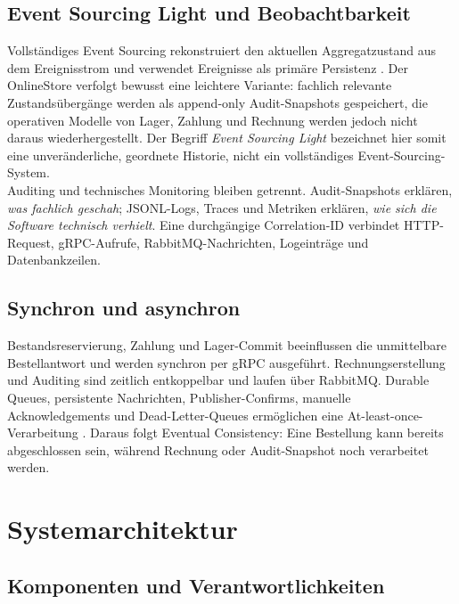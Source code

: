 \documentclass[10pt,a4paper]{article}
\newcommand{\littleGap}{\vspace{8mm}}
\newcommand{\midGap}{\vspace{12mm}}
\begin{document}
\midGap

\subsection{Event Sourcing Light und Beobachtbarkeit}

Vollständiges Event Sourcing rekonstruiert den aktuellen Aggregatzustand aus
dem Ereignisstrom und verwendet Ereignisse als primäre Persistenz
\cite{fowler}. Der OnlineStore verfolgt bewusst eine leichtere Variante:
fachlich relevante Zustandsübergänge werden als append-only Audit-Snapshots
gespeichert, die operativen Modelle von Lager, Zahlung und Rechnung werden
jedoch nicht daraus wiederhergestellt. Der Begriff \emph{Event Sourcing Light}
bezeichnet hier somit eine unveränderliche, geordnete Historie, nicht ein
vollständiges Event-Sourcing-System.\\
Auditing und technisches Monitoring bleiben getrennt. Audit-Snapshots erklären,
\emph{was fachlich geschah}; JSONL-Logs, Traces und Metriken erklären,
\emph{wie sich die Software technisch verhielt}. Eine durchgängige
Correlation-ID verbindet HTTP-Request, gRPC-Aufrufe, RabbitMQ-Nachrichten,
Logeinträge und Datenbankzeilen.
\vspace{15mm}

\subsection{Synchron und asynchron}
Bestandsreservierung, Zahlung und Lager-Commit beeinflussen die unmittelbare
Bestellantwort und werden synchron per gRPC ausgeführt. Rechnungserstellung und
Auditing sind zeitlich entkoppelbar und laufen über RabbitMQ. Durable Queues,
persistente Nachrichten, Publisher-Confirms, manuelle Acknowledgements und
Dead-Letter-Queues ermöglichen eine At-least-once-Verarbeitung
\cite{rabbitmq}. Daraus folgt Eventual Consistency: Eine Bestellung kann bereits
abgeschlossen sein, während Rechnung oder Audit-Snapshot noch verarbeitet
werden.

\midGap

\section{Systemarchitektur}
\littleGap

\subsection{Komponenten und Verantwortlichkeiten}
\end{document}
